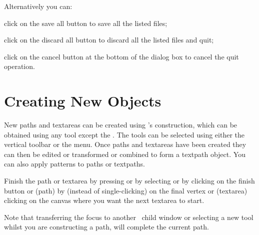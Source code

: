Alternatively you can:
\begin{deflist}

\begin{itemdesc}
click on the save all button to save all the listed files;
\end{itemdesc}


\begin{itemdesc}
click on the discard all button to discard all the listed files and
quit;
\end{itemdesc}


\begin{itemdesc}
click on the cancel button at the bottom of the dialog box to cancel
the quit operation.
\end{itemdesc}

\end{deflist}

\chapter{Creating New Objects}\label{sec:newobjects}


New \glspl{path} and \glspl{textarea} can be created using
\FlowframTk's \gls{construction}, which can be obtained using any tool
except the . The tools can be selected using either the
vertical \gls{toolbar} or the  menu. Once \glspl{path}
and \glspl{textarea} have been created they can then be edited or
transformed or combined to form a \gls{textpath} object. You can
also apply patterns to \glspl{path} or \glspl{textpath}.


Finish the \gls{path} or \gls{textarea} by pressing
 or by selecting 
or by clicking on the finish button or (\gls{path}) by
 (instead of single-clicking)
on the final vertex or (\gls{textarea}) clicking on the \gls{canvas}
where you want the next \gls{textarea} to start.  

Note that transferring the focus to
another \FlowframTk\ child window or selecting a new tool whilst you
are constructing a \gls{path}, will complete the current path.


